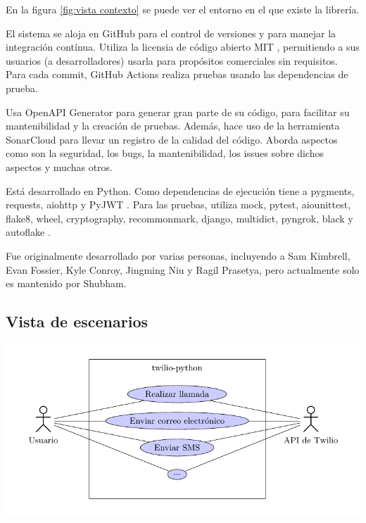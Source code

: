 \documentclass{article}
\begin{document}
\hfill

En la figura \ref{fig:vista contexto}
se puede ver el entorno en el que existe la librería.

El sistema se aloja en GitHub para el control de versiones
y para manejar la integración contínua.
Utiliza la licensia de código abierto MIT
\cite{twilio-license},
permitiendo a sus usuarios (a desarrolladores)
usarla para propósitos comerciales sin requisitos.
Para cada commit, GitHub Actions realiza pruebas
usando las dependencias de prueba.


Usa OpenAPI Generator para generar gran parte de su código, para facilitar su mantenibilidad y la creación de pruebas.
Además, hace uso de la herramienta SonarCloud para llevar un registro de la calidad del código. Aborda aspectos como son la seguridad, los bugs, la mantenibilidad, los issues sobre dichos aspectos y muchas otros.

Está desarrollado en Python.
Como dependencias de ejecución tiene a pygments, requests, aiohttp y PyJWT
\cite{twilio-runtime-dependencies}.
Para las pruebas, utiliza
mock, pytest, aiounittest, flake8,
wheel, cryptography, recommonmark,
django, multidict, pyngrok, black y autoflake
\cite{twilio-test-dependencies}.

Fue originalmente desarrollado por varias personas,
incluyendo a Sam Kimbrell, Evan Fossier,
Kyle Conroy, Jingming Niu y Ragil Prasetya,
pero actualmente solo es mantenido por Shubham.

\newpage

\subsection{Vista de escenarios}

\hfill

\begin{center}
  \includegraphics{usecase.pdf}
  \label{fig:vista escenarios}
\end{center}
\end{document}
